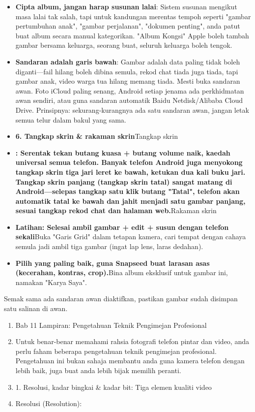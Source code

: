 \begin{itemize}
  \item \textbf{Cipta album, jangan harap susunan lalai}: Sistem susunan mengikut masa lalai tak salah, tapi untuk kandungan merentas tempoh seperti "gambar pertumbuhan anak", "gambar perjalanan", "dokumen penting", anda patut buat album secara manual kategorikan. "Album Kongsi" Apple boleh tambah gambar bersama keluarga, seorang buat, seluruh keluarga boleh tengok.
  \item \textbf{Sandaran adalah garis bawah}: Gambar adalah data paling tidak boleh diganti—fail hilang boleh dibina semula, rekod chat tiada juga tiada, tapi gambar anak, video warga tua hilang memang tiada. Mesti buka sandaran awan. Foto iCloud paling senang, Android setiap jenama ada perkhidmatan awan sendiri, atau guna sandaran automatik Baidu Netdisk/Alibaba Cloud Drive. Prinsipnya: sekurang-kurangnya ada satu sandaran awan, jangan letak semua telur dalam bakul yang sama.
  \item \textbf{6. Tangkap skrin \& rakaman skrin}Tangkap skrin
  \item \textbf{: Serentak tekan butang kuasa + butang volume naik, kaedah universal semua telefon. Banyak telefon Android juga menyokong tangkap skrin tiga jari leret ke bawah, ketukan dua kali buku jari. Tangkap skrin panjang (tangkap skrin tatal) sangat matang di Android—selepas tangkap satu klik butang "Tatal", telefon akan automatik tatal ke bawah dan jahit menjadi satu gambar panjang, sesuai tangkap rekod chat dan halaman web.}Rakaman skrin
\end{itemize}


\begin{itemize}
  \item \textbf{Latihan: Selesai ambil gambar + edit + susun dengan telefon sekali}Buka "Garis Grid" dalam tetapan kamera, cari tempat dengan cahaya semula jadi ambil tiga gambar (ingat lap lens, laras dedahan).
  \item \textbf{Pilih yang paling baik, guna Snapseed buat larasan asas (kecerahan, kontras, crop).}Bina album eksklusif untuk gambar ini, namakan "Karya Saya".
\end{itemize}

\begin{tcbpractice}{Semak sama ada sandaran awan diaktifkan, pastikan gambar sudah disimpan satu salinan di awan.}
\begin{enumerate}
  \item Bab 11 Lampiran: Pengetahuan Teknik Pengimejan Profesional
  \item Untuk benar-benar memahami rahsia fotografi telefon pintar dan video, anda perlu faham beberapa pengetahuan teknik pengimejan profesional. Pengetahuan ini bukan sahaja membantu anda guna kamera telefon dengan lebih baik, juga buat anda lebih bijak memilih peranti.
  \item 1. Resolusi, kadar bingkai \& kadar bit: Tiga elemen kualiti video
  \item Resolusi (Resolution):
\end{enumerate}

\end{tcbpractice}
